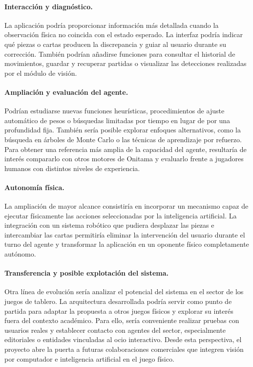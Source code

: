 \paragraph{Interacción y diagnóstico.}
La aplicación podría proporcionar información más detallada cuando la observación física no coincida con el estado esperado. La interfaz podría indicar qué piezas o cartas producen la discrepancia y guiar al usuario durante su corrección. También podrían añadirse funciones para consultar el historial de movimientos, guardar y recuperar partidas o visualizar las detecciones realizadas por el módulo de visión.

\paragraph{Ampliación y evaluación del agente.}
Podrían estudiarse nuevas funciones heurísticas, procedimientos de ajuste automático de pesos o búsquedas limitadas por tiempo en lugar de por una profundidad fija. También sería posible explorar enfoques alternativos, como la búsqueda en árboles de Monte Carlo o las técnicas de aprendizaje por refuerzo. Para obtener una referencia más amplia de la capacidad del agente, resultaría de interés compararlo con otros motores de Onitama y evaluarlo frente a jugadores humanos con distintos niveles de experiencia.

\paragraph{Autonomía física.}
La ampliación de mayor alcance consistiría en incorporar un mecanismo capaz de ejecutar físicamente las acciones seleccionadas por la inteligencia artificial. La integración con un sistema robótico que pudiera desplazar las piezas e intercambiar las cartas permitiría eliminar la intervención del usuario durante el turno del agente y transformar la aplicación en un oponente físico completamente autónomo.

\paragraph{Transferencia y posible explotación del sistema.} 
Otra línea de evolución sería analizar el potencial del sistema en el sector de los juegos de tablero. La arquitectura desarrollada podría servir como punto de partida para adaptar la propuesta a otros juegos físicos y explorar su interés fuera del contexto académico. Para ello, sería conveniente realizar pruebas con usuarios reales y establecer contacto con agentes del sector, especialmente editoriales o entidades vinculadas al ocio interactivo. Desde esta perspectiva, el proyecto abre la puerta a futuras colaboraciones comerciales que integren visión por computador e inteligencia artificial en el juego físico.

\endgroup